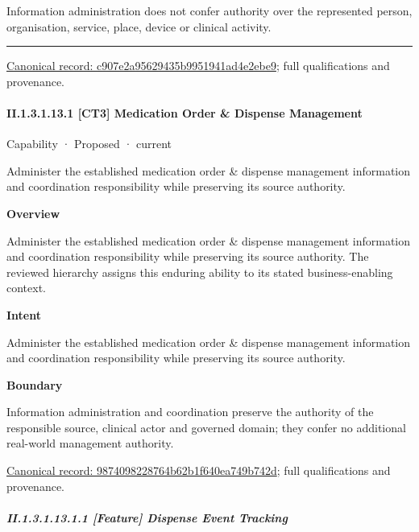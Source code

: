 Information administration does not confer authority over the represented person, organisation, service, place, device or clinical activity.



\medskip\hrule\medskip

{\footnotesize \href{../../../../../../../continuum/strategy/capability/c907e2a95629435b9951941ad4e2ebe9.md}{Canonical record: c907e2a95629435b9951941ad4e2ebe9}; full qualifications and provenance.}\par
\paragraph*{II.1.3.1.13.1 [CT3] Medication Order \& Dispense Management}
\label{navigation:II.1.3.1.13.1}

\label{element:9874098228764b62b1f640ea749b742d}
{\small Capability · Proposed · current}\par

Administer the established medication order \& dispense management information and coordination responsibility while preserving its source authority.



\textbf{Overview}



Administer the established medication order \& dispense management information and coordination responsibility while preserving its source authority. The reviewed hierarchy assigns this enduring ability to its stated business-enabling context.



\textbf{Intent}



Administer the established medication order \& dispense management information and coordination responsibility while preserving its source authority.



\textbf{Boundary}



Information administration and coordination preserve the authority of the responsible source, clinical actor and governed domain; they confer no additional real-world management authority.


{\footnotesize \href{../../../../../../../continuum/strategy/capability/9874098228764b62b1f640ea749b742d.md}{Canonical record: 9874098228764b62b1f640ea749b742d}; full qualifications and provenance.}\par
\subparagraph*{II.1.3.1.13.1.1 [Feature] Dispense Event Tracking}
\label{navigation:II.1.3.1.13.1.1}


